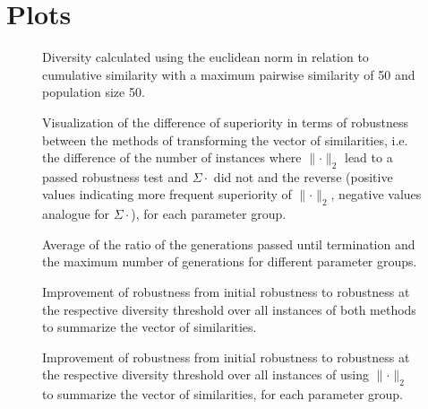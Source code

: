 \documentclass{article}
\begin{document}
\section{Plots}
\begin{figure}[H]
\centering
 \caption{Diversity calculated using the euclidean norm in relation to cumulative similarity with a maximum pairwise similarity of 50 and population size 50.}
\vskip-8pt
\end{figure}
\begin{figure}[H]
\centering
 \caption{Visualization of the difference of superiority in terms of robustness between the methods of transforming the vector of similarities, i.e. the difference of the number of instances where $\lVert \cdot \rVert _2$ lead to a passed robustness test and $\Sigma \cdot$ did not and the reverse (positive values indicating more frequent superiority of $\lVert \cdot \rVert_2$, negative values analogue for $\Sigma \cdot$), for each parameter group.}
\vskip-8pt
\end{figure}
\begin{figure}[H]
\centering
 \caption{Average of the ratio of the generations passed until termination and the maximum number of generations for different parameter groups.}
\vskip-8pt
\end{figure}
\begin{figure}[H]
\centering
 \caption{Improvement of robustness from initial robustness to robustness at the respective diversity threshold over all instances of both methods to summarize the vector of similarities.}
\vskip-8pt
\end{figure}
\begin{figure}[H]
\centering
 \caption{Improvement of robustness from initial robustness to robustness at the respective diversity threshold over all instances of using $\lVert \cdot \rVert_2$ to summarize the vector of similarities, for each parameter group.}
\vskip-8pt
\end{figure}
\newpage
\end{document}
